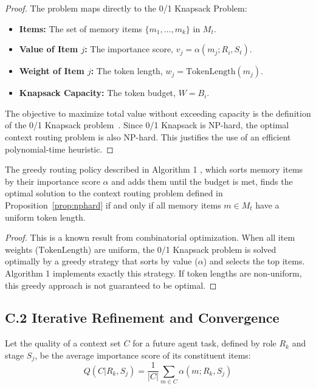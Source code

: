 \begin{proof}
The problem maps directly to the 0/1 Knapsack Problem:
\begin{itemize}
    \item \textbf{Items:} The set of memory items $\{m_1, \dots, m_k\}$ in $M_t$.
    \item \textbf{Value of Item $j$:} The importance score, $v_j = \alpha(m_j; R_i, S_t)$.
    \item \textbf{Weight of Item $j$:} The token length, $w_j = \text{TokenLength}(m_j)$.
    \item \textbf{Knapsack Capacity:} The token budget, $W = B_i$.
\end{itemize}
The objective to maximize total value without exceeding capacity is the definition of the 0/1 Knapsack problem~\cite{karp2009reducibility}. Since 0/1 Knapsack is NP-hard, the optimal context routing problem is also NP-hard. This justifies the use of an efficient polynomial-time heuristic.
\end{proof}

\begin{theorem}
\label{thm:greedy}
The greedy routing policy described in Algorithm 1 , which sorts memory items by their importance score $\alpha$ and adds them until the budget is met, finds the optimal solution to the context routing problem defined in Proposition~\ref{prop:nphard} if and only if all memory items $m \in M_t$ have a uniform token length.
\end{theorem}
\begin{proof}
This is a known result from combinatorial optimization. When all item weights ($\text{TokenLength}$) are uniform, the 0/1 Knapsack problem is solved optimally by a greedy strategy that sorts by value ($\alpha$) and selects the top items. Algorithm 1 implements exactly this strategy. If token lengths are non-uniform, this greedy approach is not guaranteed to be optimal.
\end{proof}

\subsection{C.2 \quad Iterative Refinement and Convergence}

\begin{definition}
\label{def:quality}
Let the quality of a context set $C$ for a future agent task, defined by role $R_k$ and stage $S_j$, be the average importance score of its constituent items: 
$$ Q(C | R_k, S_j) = \frac{1}{|C|} \sum_{m \in C} \alpha(m; R_k, S_j) $$
\end{definition}

